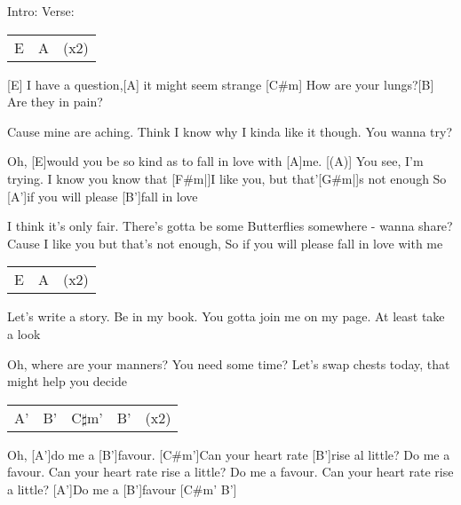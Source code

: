 
\chordscheme[%
	name = A',%
	position = 5,%
	barre = {1/1-6},%
	finger = {2/3, 3/4, 3/5}]
\chordscheme[%
	name = B',%
	position = 7,%
	barre = {1/1-6},%
	finger = {2/3, 3/4, 3/5}]
\chordscheme[%
	name = C$\sharp$m',%
	position = 9,%
	barre = {1/1-6},%
	finger = {3/4, 3/5}]


\begin{guitar}
	Intro: Verse:
	
	{\footnotesize\begin{tabular}{l|ll}
		E & A & (x2)
	\end{tabular}}
	
	[E] I have a question,[A] it might seem strange
	[C#m] How are your lungs?[B] Are they in pain?
	
	Cause mine are aching. Think I know why
	I kinda like it though. You wanna try?
	
	Oh, [E]would you be so kind as to fall in love with [A]me.
	[(A)] You see, I'm trying. I know you know that 
	[F#m|]{I }like you, but that'[G#m|]{s }not enough
	So [A']if you will please [B']fall in love
	
	I think it's only fair. There's gotta be some 
	Butterflies somewhere - wanna share?
	Cause I like you but that's not enough,
	So if you will please fall in love with me
	
	{\footnotesize\begin{tabular}{l|ll}
			E & A & (x2)
	\end{tabular}}
	
	Let's write a story. Be in my book.
	You gotta join me on my page. At least take a look
	
	Oh, where are your manners? You need some time?
	Let's swap chests today, that might help you decide
	
	 
	
	{\footnotesize\begin{tabular}{l|l|l|ll}
			A' & B' & C$\sharp$m' & B' & (x2)
	\end{tabular}}
	\pagebreak
	Oh, [A']do me a [B']favour. [C#m']Can your heart rate [B']rise al little?
	Do me a favour. Can your heart rate rise a little?
	Do me a favour. Can your heart rate rise a little?
	[A']Do me a [B']favour [C#m' B']{}
	

\end{guitar}
